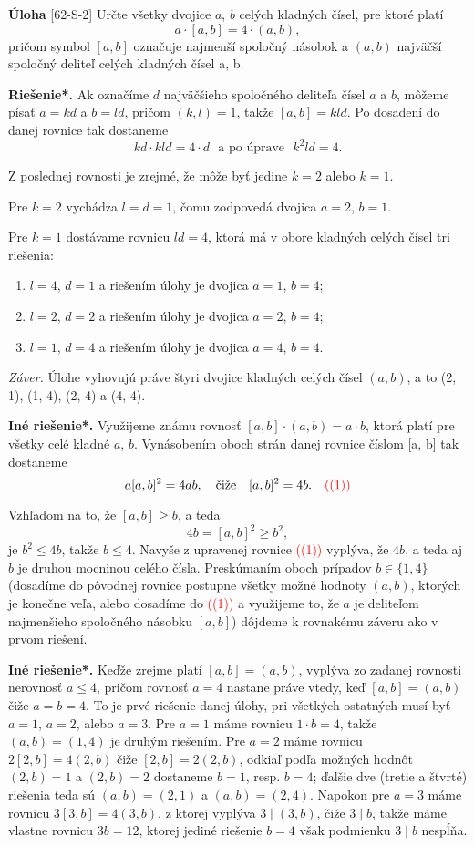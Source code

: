 \documentclass{article}
\newcommand{\rieh}{\textbf{Riešenie*.} }
\newcommand\todo[1]{\noindent\textcolor{red}{(#1)}}
\newcommand{\problem}[3]{
  \begin{tcolorbox}[breakable,notitle,boxrule=0pt,colback=light-gray,colframe=light-gray]
    \textbf{Úloha}
    [#1] #2
  \end{tcolorbox}
  \noindent#3
}
\begin{document}
\problem{62-S-2}{
Určte všetky dvojice $a$, $b$ celých kladných čísel, pre ktoré platí
$$a \cdot [a, b] = 4 \cdot (a, b),$$
pričom symbol $[a, b]$ označuje najmenší spoločný násobok a $(a, b)$ najväčší spoločný deliteľ celých kladných čísel a, b. 
}{
\rieh Ak označíme $d$ najväčšieho spoločného deliteľa čísel $a$ a $b$, môžeme písať $a = kd$ a $b = ld$, pričom $(k, l) = 1$, takže $[a, b] = kld$. Po dosadení do danej rovnice tak dostaneme
$$kd \cdot kld = 4 \cdot d \ \ \ \text{a po úprave} \ \ \ k^2ld = 4.$$

Z poslednej rovnosti je zrejmé, že môže byť jedine $k = 2$ alebo $k = 1$.

Pre $k = 2$ vychádza $l = d = 1$, čomu zodpovedá dvojica $a = 2$, $b = 1$.

Pre $k = 1$ dostávame rovnicu $ld = 4$, ktorá má v obore kladných celých čísel tri riešenia:
\begin{enumerate}
    \item $l = 4$, $d = 1$ a riešením úlohy je dvojica $a = 1$, $b = 4$;
    \item $l = 2$, $d = 2$ a riešením úlohy je dvojica $a = 2$, $b = 4$;
    \item $l = 1$, $d = 4$ a riešením úlohy je dvojica $a = 4$, $b = 4$.
\end{enumerate}
\textit{Záver.} Úlohe vyhovujú práve štyri dvojice kladných celých čísel $(a, b)$, a to (2, 1), (1, 4),
(2, 4) a (4, 4).

\textbf{Iné riešenie*.} Využijeme známu rovnosť $[a, b] \cdot (a, b) = a \cdot b$, ktorá platí pre všetky celé kladné $a$, $b$. Vynásobením oboch strán danej rovnice číslom [a, b] tak dostaneme
$$a[a, b]^2= 4ab, \ \ \ \text{čiže} \ \ \ [a, b]^2= 4b. \ \ \ \todo{ (1)}$$

Vzhľadom na to, že $[a, b] \geq b$, a teda 
$$4b = [a, b]^2 \geq b^2,$$
je $b^2\leq  4b$, takže $b \leq 4$. Navyše z upravenej rovnice \todo{(1)} vyplýva, že $4b$, a teda aj $b$ je druhou mocninou celého čísla. Preskúmaním oboch prípadov $b \in \{1, 4\}$ (dosadíme do pôvodnej rovnice postupne všetky možné hodnoty $(a, b)$, ktorých je konečne veľa, alebo dosadíme do \todo{(1)} a využijeme to, že $a$ je deliteľom najmenšieho spoločného násobku $[a, b]$) dôjdeme k rovnakému záveru ako v prvom riešení.

\textbf{Iné riešenie*.} Keďže zrejme platí $[a, b] = (a, b)$, vyplýva zo zadanej rovnosti nerovnosť $a \leq 4$, pričom rovnosť $a = 4$ nastane práve vtedy, keď $[a, b] = (a, b)$ čiže $a = b = 4$. To je prvé riešenie danej úlohy, pri všetkých ostatných musí byť $a = 1$, $a = 2$, alebo $a = 3$. Pre $a = 1$ máme rovnicu $1 \cdot b = 4$, takže $(a, b) = (1, 4)$ je druhým riešením. Pre $a = 2$ máme rovnicu $2[2, b] = 4(2, b)$ čiže $[2, b] = 2(2, b)$, odkiaľ podľa možných hodnôt $(2, b) = 1$ a $(2, b) = 2$ dostaneme $b = 1$, resp. $b = 4$; ďalšie dve (tretie a štvrté) riešenia teda sú $(a, b) = (2, 1)$ a $(a, b) = (2, 4)$. Napokon pre $a = 3$ máme rovnicu $3[3, b] = 4(3, b)$, z ktorej vyplýva $3 \mid (3, b)$, čiže $3 \mid b$, takže máme vlastne rovnicu $3b = 12$, ktorej jediné riešenie $b = 4$ však podmienku $3 \mid b$ nespĺňa.

}
\end{document}
